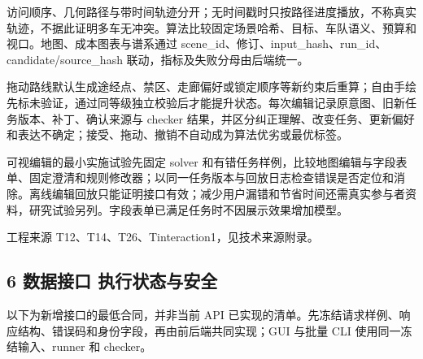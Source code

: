 \documentclass[11pt,a4paper]{article}
\newcommand{\bodytext}[1]{#1\par}
\newcommand{\sourcetext}[1]{{\fontsize{9.2}{14}\selectfont\color{Muted}#1\par}}
\begin{document}
\bodytext{访问顺序、几何路径与带时间轨迹分开；无时间戳时只按路径进度播放，不称真实轨迹，不据此证明多车无冲突。算法比较固定场景哈希、目标、车队语义、预算和视口。地图、成本图表与谱系通过 scene\_\allowbreak{}id、修订、input\_\allowbreak{}hash、run\_\allowbreak{}id、candidate/\allowbreak{}source\_\allowbreak{}hash 联动，指标及失败分母由后端统一。}
\bodytext{拖动路线默认生成途经点、禁区、走廊偏好或锁定顺序等新约束后重算；自由手绘先标未验证，通过同等级独立校验后才能提升状态。每次编辑记录原意图、旧新任务版本、补丁、确认来源与 checker 结果，并区分纠正理解、改变任务、更新偏好和表达不确定；接受、拖动、撤销不自动成为算法优劣或最优标签。}
\bodytext{可视编辑的最小实施试验先固定 solver 和有错任务样例，比较地图编辑与字段表单、固定澄清和规则修改器；以同一任务版本与回放日志检查错误是否定位和消除。离线编辑回放只能证明接口有效；减少用户漏错和节省时间还需真实参与者资料，研究试验另列。字段表单已满足任务时不因展示效果增加模型。}
\sourcetext{工程来源 T12、T14、T26、Tinteraction1，见技术来源附录。}
\subsection{6  数据接口 执行状态与安全}
\bodytext{以下为新增接口的最低合同，并非当前 API 已实现的清单。先冻结请求样例、响应结构、错误码和身份字段，再由前后端共同实现；GUI 与批量 CLI 使用同一冻结输入、runner 和 checker。}
\begingroup
\fontsize{9.6}{14.6}\selectfont
\setlength{\tabcolsep}{4pt}
\renewcommand{\arraystretch}{1.18}
\end{document}
